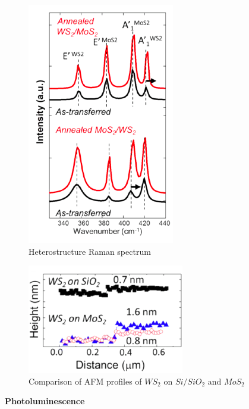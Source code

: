 \begin{figure}[h]
	\begin{center}
		\includegraphics[scale=0.7]{Heterostructures/HeterostructureRamanSpectrumIntro.png}
		\caption{Heterostructure Raman spectrum}
		\label{fig:HeterostructureRamanSpectrumIntro}
	\end{center}
\end{figure}

\begin{figure}[h]
	\begin{center}
		\includegraphics[scale=1]{Heterostructures/HeterostructureAFMProfile.png}
		\caption{Comparison of AFM profiles of $WS_2$ on $Si/SiO_2$ and $MoS_2$}
		\label{fig:HeterostructureAFMProfile}
	\end{center}
\end{figure}


\textbf{Photoluminescence} 

